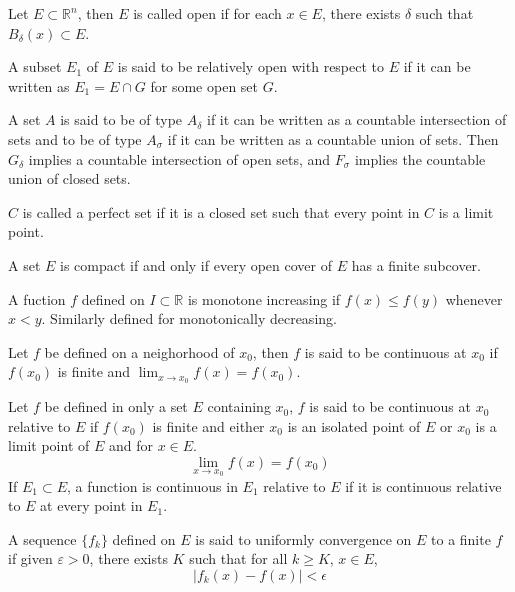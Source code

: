 \documentclass[openany]{book}
\newcommand{\R}{\mathbb{R}}
\begin{document}
\begin{defn}
    Let $E\subset\R^n$, then $E$ is called open if for each $x\in E$, there exists $\delta$ such that $B_\delta(x)\subset E$.

    A subset $E_1$ of $E$ is said to be relatively open with respect to $E$ if it can be written as $E_1=E\cap G$ for some open set $G$. 
\end{defn}
\begin{defn}
    A set $A$ is said to be of type $A_\delta$ if it can be written as a countable intersection of sets and to be of type $A_\sigma$ if it can be written as a countable union of sets. Then $G_\delta$ implies a countable intersection of open sets, and $F_\sigma$ implies the countable union of closed sets.
\end{defn}
\begin{defn}
    $C$ is called a perfect set if it is a closed set such that every point in $C$ is a limit point.
\end{defn}
\begin{defn}
    A set $E$ is compact if and only if every open cover of $E$ has a finite subcover. 
\end{defn}
\begin{defn}
    A fuction $f$ defined on $I\subset\R$ is monotone increasing if $f(x)\leq f(y)$ whenever $x<y$. Similarly defined for monotonically decreasing.
\end{defn}
\begin{defn}[continuous]
    Let $f$ be defined on a neighorhood of $x_0$, then $f$ is said to be continuous at $x_0$ if $f(x_0)$ is finite and $\lim_{x\to x_0}f(x)=f(x_0)$.
\end{defn}
\begin{defn}
    Let $f$ be defined in only a set $E$ containing $x_0$, $f$ is said to be continuous at $x_0$ relative to $E$ if $f(x_0)$ is finite and either $x_0$ is an isolated point of $E$ or $x_0$ is a limit point of $E$ and for $x\in E$.
    \begin{equation*}
        \lim_{x\to x_0}f(x)=f(x_0)
    \end{equation*}
    If $E_1\subset E$, a function is continuous in $E_1$ relative to $E$ if it is continuous relative to $E$ at every point in $E_1$.
\end{defn}
\begin{defn}
    A sequence $\{f_k\}$ defined on $E$ is said to uniformly convergence on $E$ to a finite $f$ if given $\varepsilon>0$, there exists $K$ such that for all $k\geq K$, $x\in E$,
    \begin{equation*}
        |f_k(x)-f(x)|<\epsilon
    \end{equation*}
\end{defn}
\end{document}
